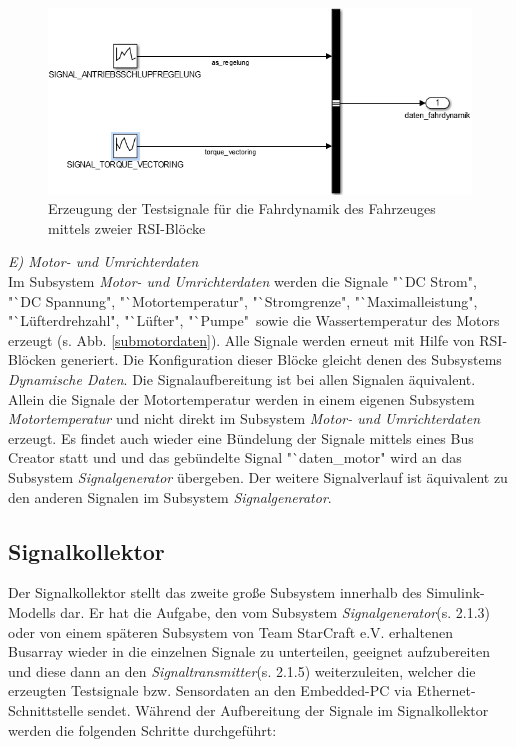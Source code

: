 \documentclass[fontsize = 12pt, paper = a4]{scrreprt}
\begin{document}
\begin{figure}[h]
\centering
\includegraphics[scale = 0.75]{makefahrdynamik}
\caption[Generierung der Testsignale für die Fahrdynamik des Fahrzeuges]{Erzeugung der Testsignale für die Fahrdynamik des Fahrzeuges mittels zweier RSI-Blöcke}
\label{makefahrdynamik}
\end{figure}

\textit{E) Motor- und Umrichterdaten} \\

Im Subsystem \textit{Motor- und Umrichterdaten} werden die Signale "`DC Strom", "`DC Spannung", "`Motortemperatur", "`Stromgrenze", "`Maximalleistung", "`Lüfterdrehzahl", "`Lüfter", "`Pumpe"\ sowie die Wassertemperatur des Motors erzeugt (s. Abb. \ref{submotordaten}). Alle Signale werden erneut mit Hilfe von RSI-Blöcken generiert. Die Konfiguration dieser Blöcke gleicht denen des Subsystems \textit{Dynamische Daten}. Die Signalaufbereitung ist bei allen Signalen äquivalent. Allein die Signale der Motortemperatur werden in einem eigenen Subsystem \textit{Motortemperatur} und nicht direkt im Subsystem \textit{Motor- und Umrichterdaten} erzeugt. Es findet auch wieder eine Bündelung der Signale mittels eines Bus Creator statt und und das gebündelte Signal "`daten\_motor" wird an das Subsystem \textit{Signalgenerator} übergeben. Der weitere Signalverlauf ist äquivalent zu den anderen Signalen im Subsystem \textit{Signalgenerator}.


\subsection{Signalkollektor}

Der Signalkollektor stellt das zweite große Subsystem innerhalb des Simulink-Modells dar. Er hat die Aufgabe, den vom Subsystem \textit{Signalgenerator}(s. 2.1.3) oder von einem späteren Subsystem von Team StarCraft e.V. erhaltenen Busarray wieder in die einzelnen Signale zu unterteilen, geeignet aufzubereiten und diese dann an den \textit{Signaltransmitter}(s. 2.1.5) weiterzuleiten, welcher die erzeugten Testsignale bzw. Sensordaten an den Embedded-PC via Ethernet-Schnittstelle sendet. Während der Aufbereitung der Signale im Signalkollektor werden die folgenden Schritte durchgeführt:
\end{document}
